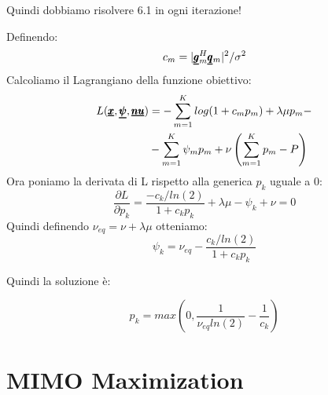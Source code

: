 \begin{center}
    Quindi dobbiamo risolvere 6.1 in ogni iterazione!
\end{center}
Definendo:
\begin{equation*}
    c_m = |\pmb{\underline{g}}_m^H \pmb{\underline{q}}_m |^2 / \sigma^2
\end{equation*}
Calcoliamo il Lagrangiano della funzione obiettivo:
\begin{equation*}
    \begin{aligned}
    L(\pmb{\underline{x}}, \pmb{\underline{\psi}}, \pmb{\underline{nu}}) &= - \sum_{m=1}^K log(1 + c_m p_m) + \lambda \mu p_m - \\
    & - \sum_{m=1}^K \psi_m p_m + \nu \left(\sum_{m=1}^K p_m - P\right)
    \end{aligned}
\end{equation*}
Ora poniamo la derivata di L rispetto alla generica $p_k$ uguale a 0:
\begin{equation*}
    \frac{\partial L}{\partial p_k} = \frac{-c_k / ln(2)}{1 + c_k p_k} + \lambda \mu - \psi_k + \nu = 0
\end{equation*}
Quindi definendo $\nu_{eq} = \nu + \lambda \mu$ otteniamo:
\begin{equation*}
    \psi_k = \nu_{eq} - \frac{c_k /ln(2)}{1 + c_k p_k}
\end{equation*}
\begin{center}
    Quindi la soluzione è:
\end{center}
\begin{equation*}
    p_k = max\left(0, \frac{1}{\nu_{eq} ln(2)} - \frac{1}{c_k}\right)
\end{equation*}


\section{MIMO Maximization}
